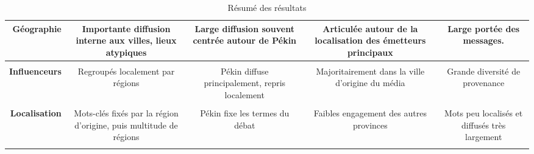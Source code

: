 {\begin{table}[h!]
\begin{tabulary}{\linewidth}{ r | C C C C}
        \textbf{Géographie} &
        Importante diffusion interne aux villes, lieux atypiques  &
        Large diffusion souvent centrée autour de Pékin &
        Articulée autour de la localisation des émetteurs principaux &
        Large portée des messages. \\
        \hline \\[-1.2ex]

        \textbf{Influenceurs} &
        Regroupés localement par régions & 
        Pékin diffuse principalement, repris localement  &
        Majoritairement dans la ville d'origine du média &
        Grande diversité de provenance \\
        \hline \\[-1.2ex]

        \textbf{Localisation} &
        Mots-clés fixés par la région d'origine, puis multitude de régions &
        Pékin fixe les termes du débat &
        Faibles engagement des autres provinces &
        Mots peu localisés et diffusés très largement \\
        \hline \\[-1.2ex]


    \end{tabulary}
    \caption[Résumé des résultats]{Résumé des résultats}
    \label{fig:viz-results}
\end{table}
}

